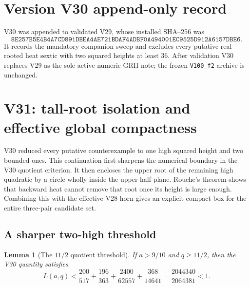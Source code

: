 \documentclass[11pt]{article}
\newtheorem{lemma}[theorem]{Lemma}
\theoremstyle{definition}
\theoremstyle{remark}
\begin{document}
\section*{Version V30 append-only record}

V30 was appended to validated V29, whose installed SHA--256 was
\[
 \texttt{8E257B5E4B4A7CD891DBEA4AE721BDAF4ADBF0A494001EC9525D912A6157DBE6}.
 \tag{N30.16}
\]
It records the mandatory companion sweep and excludes every putative
real-rooted heat sextic with two squared heights at least \(36\).  After
validation V30 replaces V29 as the sole active numeric GRH note; the frozen
\texttt{V100\_f2} archive is unchanged.




\section{V31: tall-root isolation and effective global compactness}
\label{sec:f2v31-compactness}

V30 reduced every putative counterexample to one high squared height and
two bounded ones.  This continuation first sharpens the numerical boundary
in the V30 quotient criterion.  It then encloses the upper root of the
remaining high quadratic by a circle wholly inside the upper half-plane.
Rouche's theorem shows that backward heat cannot remove that root once its
height is large enough.  Combining this with the effective V28 horn gives
an explicit compact box for the entire three-pair candidate set.

\subsection{A sharper two-high threshold}

\begin{lemma}[The \(11/2\) quotient threshold]
\label{lem:f2v31-eleven-halves}
If \(a>9/10\) and \(q\geq11/2\), then the V30 quantity satisfies
\[
 L(a,q)
 <
 \frac{200}{517}+\frac{196}{363}
 +\frac{2400}{62557}+\frac{368}{14641}
 =
 \frac{2044340}{2064381}<1.
 \tag{N31.1}
\]
\end{lemma}
\end{document}
